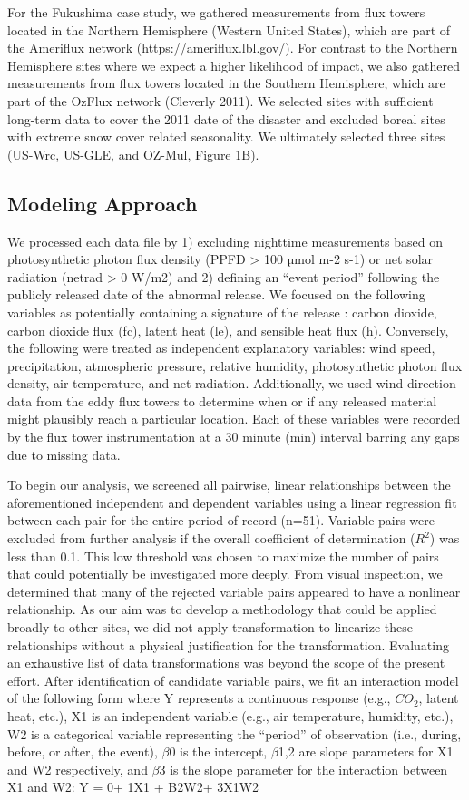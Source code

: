 \documentclass{article}
\begin{document}
For the Fukushima case study, we gathered measurements from flux towers located in the Northern Hemisphere (Western United States), which are part of the Ameriflux network (https://ameriflux.lbl.gov/). For contrast to the Northern Hemisphere sites where we expect a higher likelihood of impact, we also gathered measurements from flux towers located in the Southern Hemisphere, which are part of the OzFlux network (Cleverly 2011). We selected sites with sufficient long-term data to cover the 2011 date of the disaster and excluded boreal sites with extreme snow cover related seasonality. We ultimately selected three sites (US-Wrc, US-GLE, and OZ-Mul, Figure 1B).

\subsection{Modeling Approach}
We processed each data file by 1) excluding nighttime measurements based on photosynthetic photon flux density (PPFD > 100 µmol m-2 s-1) or net solar radiation (netrad > 0 W/m2) and 2) defining an “event period” following the publicly released date of the abnormal release. We focused on the following variables as potentially containing a signature of the release : carbon dioxide, carbon dioxide flux (fc), latent heat (le), and sensible heat flux (h). Conversely, the following were treated as independent explanatory variables: wind speed, precipitation, atmospheric pressure, relative humidity, photosynthetic photon flux density, air temperature, and net radiation. Additionally, we used wind direction data from the eddy flux towers to determine when or if any released material might plausibly reach a particular location. Each of these variables were recorded by the flux tower instrumentation at a 30 minute (min) interval barring any gaps due to missing data.

To begin our analysis, we screened all pairwise, linear relationships between the aforementioned independent and dependent variables using a linear regression fit between each pair for the entire period of record (n=51). Variable pairs were excluded from further analysis if the overall coefficient of determination ($R^2$) was less than 0.1. This low threshold was chosen to maximize the number of pairs that could potentially be investigated more deeply. From visual inspection, we determined that many of the rejected variable pairs appeared to have a nonlinear relationship. As our aim was to develop a methodology that could be applied broadly to other sites, we did not apply transformation to linearize these relationships without a physical justification for the transformation. Evaluating an exhaustive list of data transformations was beyond the scope of the present effort. After identification of candidate variable pairs, we fit an interaction model of the following form where Y represents a continuous response (e.g., $CO_2$, latent heat, etc.), X1 is an independent variable (e.g., air temperature, humidity, etc.), W2 is a categorical variable representing the “period” of observation (i.e., during, before, or after, the event), $\beta$0 is the intercept, $\beta$1,2 are slope parameters for X1 and W2 respectively, and $\beta$3 is the slope parameter for the interaction between X1 and W2:
Y = 0+ 1X1 + B2W2+ 3X1W2
\end{document}
